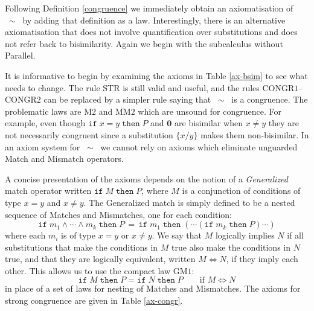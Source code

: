 \documentclass[10pt,a4paper]{article}
\newcommand{\ifthen}[2]{\texttt{if}\;#1\;\texttt{then}\;#2}
\newcommand{\nil}{\mathbf{0}}
\newcommand{\rulname}[1]{\scriptstyle \text{#1}}
\newcommand{\congr}{\:\sim\:}
\begin{document}
Following Definition \ref{congruence} we immediately obtain an axiomatisation of $\congr$ by adding that definition as a law. Interestingly, there is an alternative axiomatisation that does not involve quantification over substitutions and does not refer back to bisimilarity. Again we begin with the subcalculus without Parallel.

It is informative to begin by examining the axioms in Table \ref{ax-bsim} to see what needs to change. The rule $\rulname{STR}$ is still valid and useful, and the rules $\rulname{CONGR1}$--$\rulname{CONGR2}$ can be replaced by a simpler rule saying that $\congr$ is a congruence. The problematic laws are $\rulname{M2}$ and $\rulname{MM2}$ which are unsound for congruence. For example, even though $\ifthen{x = y}{P}$ and $\nil$ are bisimilar when $x \neq y$ they are not necessarily congruent since a substitution $\{x/y\}$ makes them non-bisimilar. In an axiom system for $\congr$ we cannot rely on axioms which eliminate unguarded Match and Mismatch operators.

A concise presentation of the axioms depends on the notion of a \emph{Generalized} match operator written $\ifthen{M}{P}$, where $M$ is a conjunction of conditions of type $x = y$ and $x \neq y$. The Generalized match is simply defined to be a nested sequence of Matches and Mismatches, one for each condition:
\[
	\ifthen{m_1 \wedge \cdots \wedge m_k}{P} \,=\, \ifthen{m_1}{(\cdots(\ifthen{m_k}{P})\cdots)}
\]
where each $m_i$ is of type $x = y$ or $x \neq y$. We say that $M$ logically implies $N$ if all substitutions that make the conditions in $M$ true also make the conditions in $N$ true, and that they are logically equivalent, written $M \Leftrightarrow N$, if they imply each other. This allows us to use the compact law $\rulname{GM1}$:
\[
	\ifthen{M}{P} = \ifthen{N}{P} \qquad \text{if } M \Leftrightarrow N
\]
in place of a set of laws for nesting of Matches and Mismatches. The axioms for strong congruence are given in Table \ref{ax-congr}.
\end{document}
